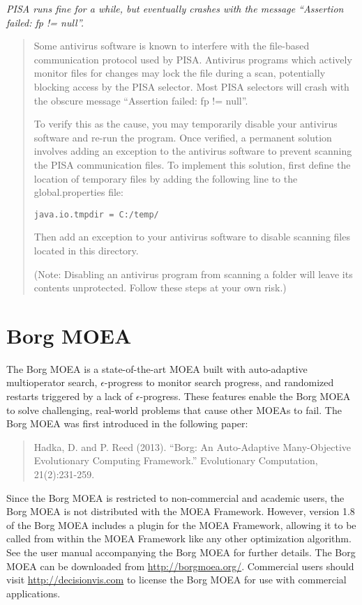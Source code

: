 \noindent
\textit{PISA runs fine for a while, but eventually crashes with the message ``Assertion failed: fp != null''.}

\begin{quote}
Some antivirus software is known to interfere with the file-based communication protocol used by PISA.  Antivirus programs which actively monitor files for changes may lock the file during a scan, potentially blocking access by the PISA selector.  Most PISA selectors will crash with the obscure message ``Assertion failed: fp != null''.

To verify this as the cause, you may temporarily disable your antivirus software and re-run the program.  Once verified, a permanent solution involves adding an exception to the antivirus software to prevent scanning the PISA communication files.  To implement this solution, first define the location of temporary files by adding the following line to the global.properties file:

\begin{lstlisting}[language=Plaintext]
java.io.tmpdir = C:/temp/
\end{lstlisting}

Then add an exception to your antivirus software to disable scanning files located in this directory.

(Note: Disabling an antivirus program from scanning a folder will leave its contents unprotected.  Follow these steps at your own risk.)
\end{quote}

\section{Borg MOEA}

The Borg MOEA is a state-of-the-art MOEA built with auto-adaptive multioperator search, $\epsilon$-progress to monitor search progress, and randomized restarts triggered by a lack of $\epsilon$-progress.  These features enable the Borg MOEA to solve challenging, real-world problems that cause other MOEAs to fail.  The Borg MOEA was first introduced in the following paper:
\begin{quote}
Hadka, D. and P. Reed (2013). ``Borg: An Auto-Adaptive Many-Objective Evolutionary Computing Framework.'' Evolutionary Computation, 21(2):231-259.
\end{quote}
Since the Borg MOEA is restricted to non-commercial and academic users, the Borg MOEA is not distributed with the MOEA Framework.  However, version 1.8 of the Borg MOEA includes a plugin for the MOEA Framework, allowing it to be called from within the MOEA Framework like any other optimization algorithm.  See the user manual accompanying the Borg MOEA for further details.  The Borg MOEA can be downloaded from \url{http://borgmoea.org/}.  Commercial users should visit \url{http://decisionvis.com} to license the Borg MOEA for use with commercial applications.

